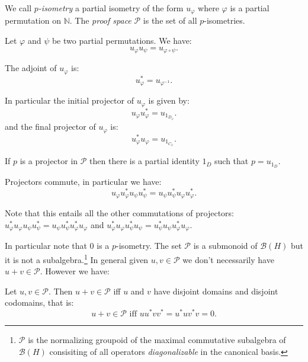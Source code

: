 \begin{definition}
We call \emph{$p$-isometry} a partial isometry of the form $u_\varphi$ where $\varphi$ is a partial permutation on $\mathbb{N}$. The \emph{proof space} $\mathcal{P}$ is the set of all $p$-isometries.
\end{definition}

\begin{proposition}
Let $\varphi$ and $\psi$ be two partial permutations. We have:
\begin{equation*}
u_\varphi u_\psi = u_{\varphi\circ\psi}.
\end{equation*}

The adjoint of $u_\varphi$ is:
\begin{equation*}
u_\varphi^* = u_{\varphi^{-1}}.
\end{equation*}

In particular the initial projector of $u_{\varphi}$ is given by:
\begin{equation*}
u_\varphi u^*_\varphi = u_{1_{D_\varphi}}.
\end{equation*}
and the final projector of $u_\varphi$ is:
\begin{equation*}
u^*_\varphi u_\varphi = u_{1_{C_\varphi}}.
\end{equation*}

If $p$ is a projector in $\mathcal{P}$ then there is a partial identity $1_D$ such that $p= u_{1_D}$.

Projectors commute, in particular we have:
\begin{equation*}
u_\varphi u_\varphi^*u_\psi u_\psi^* = u_\psi u_\psi^*u_\varphi u_\varphi^*.
\end{equation*}
\end{proposition}

Note that this entails all the other commutations of projectors:
\(u^*_\varphi u_\varphi u_\psi u^*_\psi = u_\psi u^*_\psi u^*_\varphi u_\varphi\)
and
\(u^*_\varphi u_\varphi u^*_\psi u_\psi = u^*_\psi u_\psi u^*_\varphi u_\varphi\).

In particular note that \(0\) is a \(p\)-isometry. The set
\(\mathcal{P}\) is a submonoid of \(\mathcal{B}(H)\) but it is not a
subalgebra.\footnote{\(\mathcal{P}\) is the normalizing groupoid of the
  maximal commutative subalgebra of \(\mathcal{B}(H)\) consisiting of
  all operators \emph{diagonalizable} in the canonical basis.}
In general given \(u,v\in\mathcal{P}\) we don't necessarily have
\(u+v\in\mathcal{P}\). However we have:

\begin{proposition}
Let $u, v\in\mathcal{P}$. Then $u+v\in\mathcal{P}$ iff $u$ and $v$ have disjoint domains and disjoint codomains, that is:
\begin{equation*}
u+v\in\mathcal{P}\text{ iff }uu^*vv^* = u^*uv^*v = 0.
\end{equation*}
\end{proposition}

